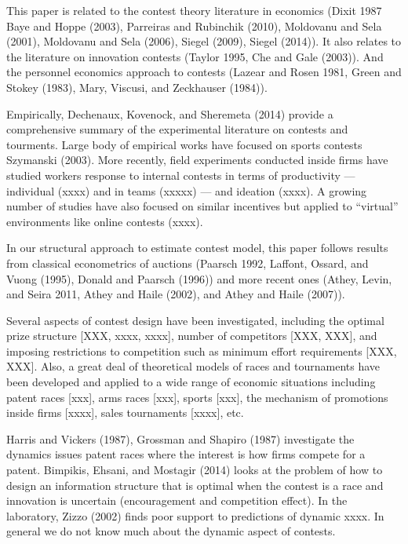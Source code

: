 \documentclass[11pt, titlepage]{article}
\begin{document}
This paper is related to the contest theory literature in economics
(Dixit 1987 Baye and Hoppe (2003), Parreiras and Rubinchik (2010),
Moldovanu and Sela (2001), Moldovanu and Sela (2006), Siegel (2009),
Siegel (2014)). It also relates to the literature on innovation contests
(Taylor 1995, Che and Gale (2003)). And the personnel economics approach
to contests (Lazear and Rosen 1981, Green and Stokey (1983), Mary,
Viscusi, and Zeckhauser (1984)).

Empirically, Dechenaux, Kovenock, and Sheremeta (2014) provide a
comprehensive summary of the experimental literature on contests and
tourments. Large body of empirical works have focused on sports contests
Szymanski (2003). More recently, field experiments conducted inside
firms have studied workers response to internal contests in terms of
productivity --- individual (xxxx) and in teams (xxxxx) --- and ideation
(xxxx). A growing number of studies have also focused on similar
incentives but applied to ``virtual'' environments like online contests
(xxxx).

In our structural approach to estimate contest model, this paper follows
results from classical econometrics of auctions (Paarsch 1992, Laffont,
Ossard, and Vuong (1995), Donald and Paarsch (1996)) and more recent
ones (Athey, Levin, and Seira 2011, Athey and Haile (2002), and Athey
and Haile (2007)).

Several aspects of contest design have been investigated, including the
optimal prize structure {[}XXX, xxxx, xxxx{]}, number of competitors
{[}XXX, XXX{]}, and imposing restrictions to competition such as minimum
effort requirements {[}XXX, XXX{]}. Also, a great deal of theoretical
models of races and tournaments have been developed and applied to a
wide range of economic situations including patent races {[}xxx{]}, arms
races {[}xxx{]}, sports {[}xxx{]}, the mechanism of promotions inside
firms {[}xxxx{]}, sales tournaments {[}xxxx{]}, etc.

Harris and Vickers (1987), Grossman and Shapiro (1987) investigate the
dynamics issues patent races where the interest is how firms compete for
a patent. Bimpikis, Ehsani, and Mostagir (2014) looks at the problem of
how to design an information structure that is optimal when the contest
is a race and innovation is uncertain (encouragement and competition
effect). In the laboratory, Zizzo (2002) finds poor support to
predictions of dynamic xxxx. In general we do not know much about the
dynamic aspect of contests.
\end{document}

